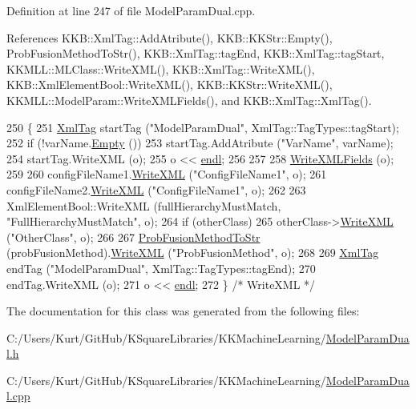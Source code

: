 Definition at line 247 of file Model\+Param\+Dual.\+cpp.



References K\+K\+B\+::\+Xml\+Tag\+::\+Add\+Atribute(), K\+K\+B\+::\+K\+K\+Str\+::\+Empty(), Prob\+Fusion\+Method\+To\+Str(), K\+K\+B\+::\+Xml\+Tag\+::tag\+End, K\+K\+B\+::\+Xml\+Tag\+::tag\+Start, K\+K\+M\+L\+L\+::\+M\+L\+Class\+::\+Write\+X\+M\+L(), K\+K\+B\+::\+Xml\+Tag\+::\+Write\+X\+M\+L(), K\+K\+B\+::\+Xml\+Element\+Bool\+::\+Write\+X\+M\+L(), K\+K\+B\+::\+K\+K\+Str\+::\+Write\+X\+M\+L(), K\+K\+M\+L\+L\+::\+Model\+Param\+::\+Write\+X\+M\+L\+Fields(), and K\+K\+B\+::\+Xml\+Tag\+::\+Xml\+Tag().


\begin{DoxyCode}
250 \{
251   \hyperlink{class_k_k_b_1_1_xml_tag}{XmlTag}  startTag (\textcolor{stringliteral}{"ModelParamDual"},  XmlTag::TagTypes::tagStart);
252   \textcolor{keywordflow}{if}  (!varName.\hyperlink{class_k_k_b_1_1_k_k_str_ac69942f73fffd672ec2a6e1c410afdb6}{Empty} ())
253     startTag.AddAtribute (\textcolor{stringliteral}{"VarName"}, varName);
254   startTag.WriteXML (o);
255   o << \hyperlink{namespace_k_k_b_ad1f50f65af6adc8fa9e6f62d007818a8}{endl};
256 
257 
258   \hyperlink{class_k_k_m_l_l_1_1_model_param_a91dc06ec604cf9c2a045991e9b88b5d3}{WriteXMLFields} (o);
259 
260   configFileName1.\hyperlink{class_k_k_b_1_1_k_k_str_a7de8ac49f70cdcdf2cc31786d23b8a62}{WriteXML} (\textcolor{stringliteral}{"ConfigFileName1"}, o);
261   configFileName2.\hyperlink{class_k_k_b_1_1_k_k_str_a7de8ac49f70cdcdf2cc31786d23b8a62}{WriteXML} (\textcolor{stringliteral}{"ConfigFileName1"}, o);
262 
263   XmlElementBool::WriteXML (fullHierarchyMustMatch, \textcolor{stringliteral}{"FullHierarchyMustMatch"}, o);
264   \textcolor{keywordflow}{if}  (otherClass)
265     otherClass->\hyperlink{class_k_k_m_l_l_1_1_m_l_class_a3ba7c0c32b973c8cd0231d7ef8f7e122}{WriteXML} (\textcolor{stringliteral}{"OtherClass"}, o);
266 
267   \hyperlink{class_k_k_m_l_l_1_1_model_param_dual_ab51c6549d440fbc01a53d68447c3ae95}{ProbFusionMethodToStr} (probFusionMethod).\hyperlink{class_k_k_b_1_1_k_k_str_a7de8ac49f70cdcdf2cc31786d23b8a62}{WriteXML} (\textcolor{stringliteral}{"ProbFusionMethod"}, o);
268 
269   \hyperlink{class_k_k_b_1_1_xml_tag}{XmlTag}  endTag (\textcolor{stringliteral}{"ModelParamDual"}, XmlTag::TagTypes::tagEnd);
270   endTag.WriteXML (o);
271   o << \hyperlink{namespace_k_k_b_ad1f50f65af6adc8fa9e6f62d007818a8}{endl};
272 \}  \textcolor{comment}{/* WriteXML */}
\end{DoxyCode}


The documentation for this class was generated from the following files\+:\begin{DoxyCompactItemize}
\item 
C\+:/\+Users/\+Kurt/\+Git\+Hub/\+K\+Square\+Libraries/\+K\+K\+Machine\+Learning/\hyperlink{_model_param_dual_8h}{Model\+Param\+Dual.\+h}\item 
C\+:/\+Users/\+Kurt/\+Git\+Hub/\+K\+Square\+Libraries/\+K\+K\+Machine\+Learning/\hyperlink{_model_param_dual_8cpp}{Model\+Param\+Dual.\+cpp}\end{DoxyCompactItemize}
